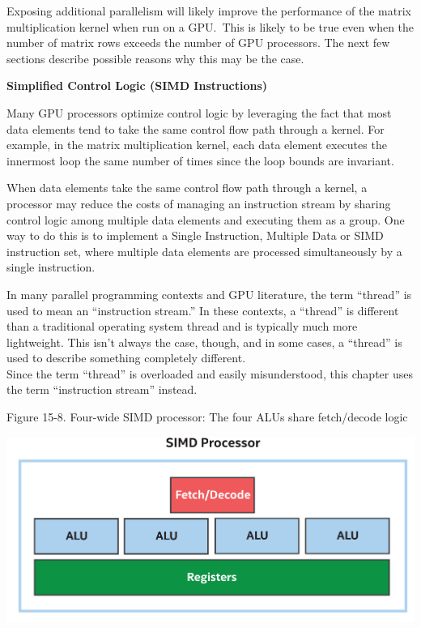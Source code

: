 Exposing additional parallelism will likely improve the performance of the matrix multiplication kernel when run on a GPU. This is likely to be true even when the number of matrix rows exceeds the number of GPU processors. The next few sections describe possible reasons why this may be the case.\par

\hspace*{\fill} \par %
\textbf{Simplified Control Logic (SIMD Instructions)}

Many GPU processors optimize control logic by leveraging the fact that most data elements tend to take the same control flow path through a kernel. For example, in the matrix multiplication kernel, each data element executes the innermost loop the same number of times since the loop bounds are invariant.\par

When data elements take the same control flow path through a kernel, a processor may reduce the costs of managing an instruction stream by sharing control logic among multiple data elements and executing them as a group. One way to do this is to implement a Single Instruction, Multiple Data or SIMD instruction set, where multiple data elements are processed simultaneously by a single instruction.\par

\begin{tcolorbox}[colback=blue!5!white,colframe=blue!75!black, title=THREADS VS. INSTRUCTION STREAMS]
In many parallel programming contexts and GPU literature, the term “thread” is used to mean an “instruction stream.” In these contexts, a “thread” is different than a traditional operating system thread and is typically much more lightweight. This isn’t always the case, though, and in some cases, a “thread” is used to describe something completely different.\\
Since the term “thread” is overloaded and easily misunderstood, this chapter uses the term “instruction stream” instead.
\end{tcolorbox}

\hspace*{\fill} \par %
Figure 15-8. Four-wide SIMD processor: The four ALUs share fetch/decode logic
\begin{center}
	\includegraphics[width=1.0\textwidth]{content/chapter-15/images/6}
\end{center}

